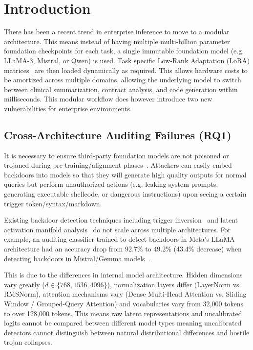 \section{Introduction}
\label{sec:intro}

There has been a recent trend in enterprise inference to move to a modular architecture. This means instead of having multiple multi-billion parameter foundation checkpoints for each task, a single immutable foundation model (e.g. LLaMA-3, Mistral, or Qwen) is used. Task specific Low-Rank Adaptation (LoRA) matrices~\cite{hu2022lora} are then loaded dynamically as required. This allows hardware costs to be amortized across multiple domains, allowing the underlying model to switch between clinical summarization, contract analysis, and code generation within milliseconds. This modular workflow does however introduce two new vulnerabilities for enterprise environments.

\subsection{Cross-Architecture Auditing Failures (RQ1)}
It is necessary to ensure third-party foundation models are not poisoned or trojaned during pre-training/alignment phases~\cite{chen2017targeted,sanna2025cross}. Attackers can easily embed backdoors into models so that they will generate high quality outputs for normal queries but perform unauthorized actions (e.g. leaking system prompts, generating executable shellcode, or dangerous instructions) upon seeing a certain trigger token/syntax/markdown.

Existing backdoor detection techniques including trigger inversion~\cite{wang2019neural} and latent activation manifold analysis~\cite{cohen2026backdoorid} do not scale across multiple architectures. For example, an auditing classifier trained to detect backdoors in Meta's LLaMA architecture had an accuracy drop from 92.7\% to 49.2\% (43.4\% decrease) when detecting backdoors in Mistral/Gemma models~\cite{sanna2025cross}.

This is due to the differences in internal model architecture. Hidden dimensions vary greatly ($d \in \{768, 1536, 4096\}$), normalization layers differ (LayerNorm vs. RMSNorm), attention mechanisms vary (Dense Multi-Head Attention vs. Sliding Window / Grouped-Query Attention) and vocabularies vary from 32,000 tokens to over 128,000 tokens. This means raw latent representations and uncalibrated logits cannot be compared between different model types meaning uncalibrated detectors cannot distinguish between natural distributional differences and hostile trojan collapses.

